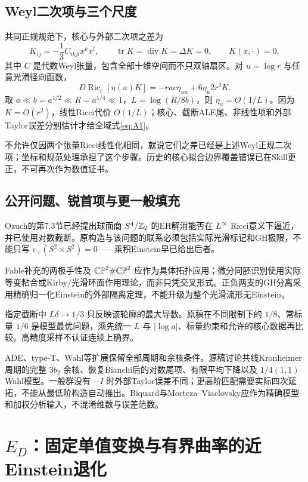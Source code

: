 \documentclass[UTF8,fontset=fandol,zihao=-4]{ctexart}
\theoremstyle{research}
\DeclareMathOperator{\Ric}{Ric}\DeclareMathOperator{\Rm}{Rm}
\DeclareMathOperator{\tr}{tr}\DeclareMathOperator{\Id}{Id}\DeclareMathOperator{\diver}{div}
\begin{document}
\subsection{Weyl二次项与三个尺度}
共同正规规范下，核心与外部二次项之差为
\[
 K_{ij}=-\frac13C_{ikjl}x^kx^l,
 \qquad \tr K=\diver K=\Delta K=0,\qquad K(x,\cdot)=0,
\]
其中 $C$ 是代数Weyl张量，包含全部十维空间而不只双轴扇区。对 $u=\log r$ 与任意光滑径向函数，
\begin{equation}\label{eq:logidentity}
 D\Ric_e[\eta(u)K]=-rac{\eta_{uu}+6\eta_u}{2r^2}K.
\end{equation}
取 $a\ll b=a^{1/2}\ll R=a^{1/4}\ll1$，$L=\log(R/8b)$，则 $\eta_u=O(1/L)$。因为 $K=O(r^2)$，线性Ricci代价 $O(1/L)$；核心、截断ALE尾、非线性项和外部Taylor误差分别估计才给全域式\eqref{eq:A1}。

不允许仅因两个张量Ricci线性化相同，就说它们之差已经是上述Weyl正规二次项；坐标和规范处理承担了这个步骤。历史的核心拟合边界覆盖错误已在Skill更正，不可再次作为数值证书。

\subsection{公开问题、锐首项与更一般填充}
Ozuch的第7.3节已经提出球面商 $S^4/\mathbb Z_2$ 的EH解消能否在 $L^\infty$ Ricci意义下逼近，并已使用对数截断\cite{OzuII}。原构造与该问题的联系必须包括实际光滑标记和GH极限，不能只写 $e_+(S^2\times S^2)=0$——乘积Einstein早已给出后者。

Fable补充的两极手性及 $\mathbb{CP}^2\#\mathbb{CP}^2$ 应作为具体拓扑应用；微分同胚识别使用实际等变粘合或Kirby/光滑环面作用理论，而非只凭交叉形式\cite{Fable}。正负两支的GH分离采用精确归一化Einstein的外部隔离定理\cite{OzuInt,HO}，不能升级为整个光滑流形无Einstein。

指定截断中 $L\delta\to1/3$ 只反映该轮廓的最大导数。原稿在不同限制下的 $1/8$、常标量 $1/6$ 是模型最优问题，须先统一 $L$ 与 $|\log a|$、标量约束和允许的核心数据再比较。高精度采样不认证连续上确界。

ADE、type-T、Wahl等扩展保留全部周期和余核条件。源稿讨论共线Kronheimer周期的完整 $3b_2$ 余核、恢复Bianchi后的对数尾项、有限平均下降以及 $1/4(1,1)$ Wahl模型。一般群没有 $-I$ 时外部Taylor误差不同；更高阶匹配需要实际四次延拓，不能从最低阶构造自动推出。Biquard与Morteza--Viaclovsky\cite{Biquard,MV}应作为精确模型和加权分析输入，不混淆维数与误差范数。

\section{$E_D$：固定单值变换与有界曲率的近Einstein退化}
\end{document}
